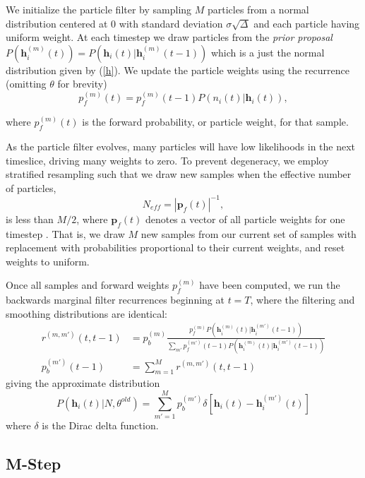 \documentclass{article}
\begin{document}
We initialize the particle filter by sampling $M$ particles from a
normal distribution centered at 0 with standard deviation
$\sigma\sqrt{\Delta}$ and each particle having uniform weight. At each timestep we draw
particles from the \emph{prior proposal}
$P(\mathbf{h}_i^{(m)}(t)) = P(\mathbf{h}_i(t) | \mathbf{h}_i^{(m)}(t - 1))$
which is a just the normal distribution given by (\ref{h}). We update
the particle weights using the recurrence (omitting $\theta$ for brevity)
\begin{equation} \label{pf}
p_f^{(m)}(t) = p_f^{(m)}(t - 1)P(n_i(t) | \mathbf{h}_i(t)),
\end{equation}

where $p_f^{(m)}(t)$ is the forward probability, or particle weight, for that sample.

As the particle filter evolves, many particles will have low
likelihoods in the next timeslice, driving many weights to zero.
To prevent degeneracy, we employ stratified resampling such that we draw new samples when the effective number of particles,
\begin{equation} \label{Neff}
N_{eff} = \left|\mathbf{p}_f(t)\right|^{-1},
\end{equation}
is less than $M/2$, where $\mathbf{p}_f(t)$ denotes a vector of all
particle weights for one timestep \citep{vogelstein2009}. That is,
we draw $M$ new samples from our current set of samples with
replacement with probabilities proportional to their current weights,
and reset weights to uniform.

Once all samples and forward weights $p_f^{(m)}$ have been computed,
we run the backwards marginal filter recurrences beginning at $t=T$,
where the filtering and smoothing distributions are identical:
\begin{align}
r^{(m,m')}(t, t - 1) &= p_b^{(m)}\frac{p_f^{(m)}P(\mathbf{h}_i^{(m)}(t)|\mathbf{h}_i^{(m')}(t - 1))}{\sum_{m'} p_f^{(m')}(t - 1) P(\mathbf{h}_i^{(m)}(t)|\mathbf{h}_i^{(m')}(t - 1))} \\
p_b^{(m')}(t - 1)    &= \sum_{m=1}^M r^{(m,m')}(t, t - 1)
\end{align}
giving the approximate distribution
\begin{equation} \label{Ph}
P(\mathbf{h}_i(t) | N, \theta^{old}) = \sum_{m'=1}^{M} p_b^{(m')} \delta\left[\mathbf{h}_i(t) - \mathbf{h}_i^{(m')}(t)\right]
\end{equation}
where $\delta$ is the Dirac delta function.

\subsection{M-Step}
\end{document}
